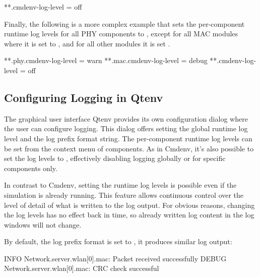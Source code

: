 \begin{inifile}
[General]
**.cmdenv-log-level = off
\end{inifile}

Finally, the following is a more complex example that sets the per-component
runtime log levels for all PHY components to , except for
all MAC modules where it is set to , and for all other
modules it is set .

\begin{inifile}
[General]
**.phy.cmdenv-log-level = warn
**.mac.cmdenv-log-level = debug
**.cmdenv-log-level = off
\end{inifile}

\subsection{Configuring Logging in Qtenv}
\label{sec:config-sim:configuring-logging-in-qtenv}

The graphical user interface Qtenv provides its own configuration
dialog where the user can configure logging. This dialog offers setting the
global runtime log level and the log prefix format string. The per-component
runtime log levels can be set from the context menu of components. As in Cmdenv,
it's also possible to set the log levels to , effectively disabling
logging globally or for specific components only.

In contrast to Cmdenv, setting the runtime log levels is possible even if the
simulation is already running. This feature allows continuous control over the
level of detail of what is written to the log output. For obvious reasons,
changing the log levels has no effect back in time, so already written log
content in the log windows will not change.

By default, the log prefix format is set to , it produces
similar log output:

\begin{filelisting}
INFO  Network.server.wlan[0].mac: Packet received successfully
DEBUG Network.server.wlan[0].mac: CRC check successful
\end{filelisting}



